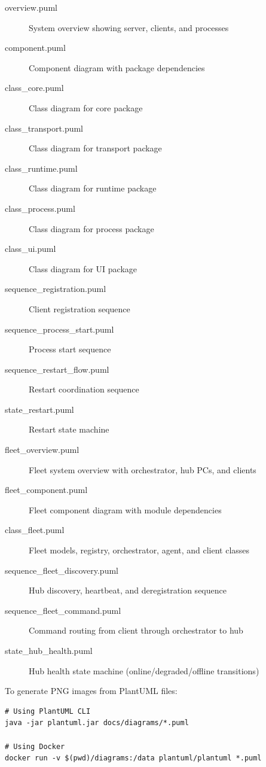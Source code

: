 \begin{description}
   \item[overview.puml] System overview showing server, clients, and processes
   \item[component.puml] Component diagram with package dependencies
   \item[class\_core.puml] Class diagram for core package
   \item[class\_transport.puml] Class diagram for transport package
   \item[class\_runtime.puml] Class diagram for runtime package
   \item[class\_process.puml] Class diagram for process package
   \item[class\_ui.puml] Class diagram for UI package
   \item[sequence\_registration.puml] Client registration sequence
   \item[sequence\_process\_start.puml] Process start sequence
   \item[sequence\_restart\_flow.puml] Restart coordination sequence
   \item[state\_restart.puml] Restart state machine
   \item[fleet\_overview.puml] Fleet system overview with orchestrator, hub PCs, and clients
   \item[fleet\_component.puml] Fleet component diagram with module dependencies
   \item[class\_fleet.puml] Fleet models, registry, orchestrator, agent, and client classes
   \item[sequence\_fleet\_discovery.puml] Hub discovery, heartbeat, and deregistration sequence
   \item[sequence\_fleet\_command.puml] Command routing from client through orchestrator to hub
   \item[state\_hub\_health.puml] Hub health state machine (online/degraded/offline transitions)
\end{description}

To generate PNG images from PlantUML files:

\begin{verbatim}
# Using PlantUML CLI
java -jar plantuml.jar docs/diagrams/*.puml

# Using Docker
docker run -v $(pwd)/diagrams:/data plantuml/plantuml *.puml
\end{verbatim}
